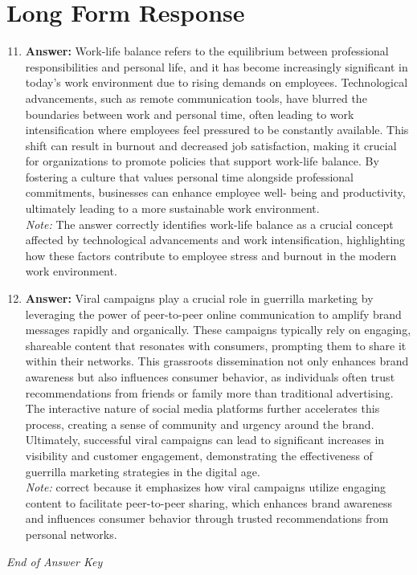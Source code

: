 \documentclass[12pt]{article}
\begin{document}
\section*{Long Form Response}
\begin{enumerate}[label=\arabic*.]
\setcounter{enumi}{10}
\item \textbf{Answer:} Work-life balance refers to the equilibrium between professional responsibilities and personal life, and it has become increasingly significant in today's work environment due to rising demands on employees. Technological advancements, such as remote communication tools, have blurred the boundaries between work and personal time, often leading to work intensification where employees feel pressured to be constantly available. This shift can result in burnout and decreased job satisfaction, making it crucial for organizations to promote policies that support work-life balance. By fostering a culture that values personal time alongside professional commitments, businesses can enhance employee well- being and productivity, ultimately leading to a more sustainable work environment.
\\ \textit{Note:} The answer correctly identifies work-life balance as a crucial concept affected by technological advancements and work intensification, highlighting how these factors contribute to employee stress and burnout in the modern work environment.
\item \textbf{Answer:} Viral campaigns play a crucial role in guerrilla marketing by leveraging the power of peer-to-peer online communication to amplify brand messages rapidly and organically. These campaigns typically rely on engaging, shareable content that resonates with consumers, prompting them to share it within their networks. This grassroots dissemination not only enhances brand awareness but also influences consumer behavior, as individuals often trust recommendations from friends or family more than traditional advertising. The interactive nature of social media platforms further accelerates this process, creating a sense of community and urgency around the brand. Ultimately, successful viral campaigns can lead to significant increases in visibility and customer engagement, demonstrating the effectiveness of guerrilla marketing strategies in the digital age.
\\ \textit{Note:} correct because it emphasizes how viral campaigns utilize engaging content to facilitate peer-to-peer sharing, which enhances brand awareness and influences consumer behavior through trusted recommendations from personal networks.
\end{enumerate}

\vfill
\noindent\textit{End of Answer Key}
\end{document}
